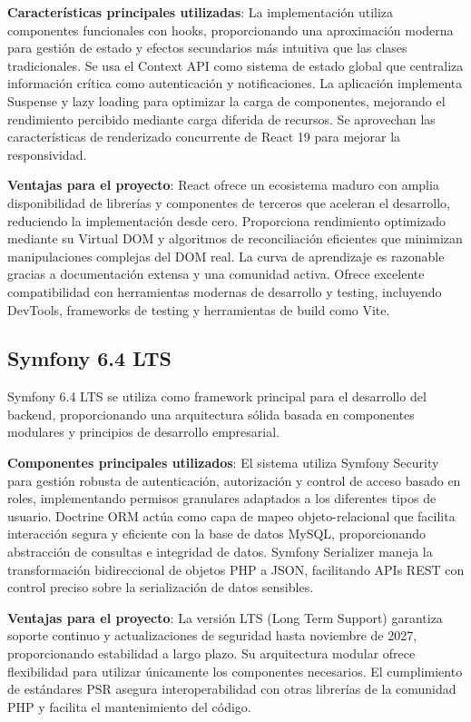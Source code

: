 \documentclass[12pt,a4paper,oneside]{report}
\begin{document}
\textbf{Características principales utilizadas}: La implementación utiliza componentes funcionales con hooks, proporcionando una aproximación moderna para gestión de estado y efectos secundarios más intuitiva que las clases tradicionales. Se usa el Context API como sistema de estado global que centraliza información crítica como autenticación y notificaciones. La aplicación implementa Suspense y lazy loading para optimizar la carga de componentes, mejorando el rendimiento percibido mediante carga diferida de recursos. Se aprovechan las características de renderizado concurrente de React 19 para mejorar la responsividad.

\textbf{Ventajas para el proyecto}: React ofrece un ecosistema maduro con amplia disponibilidad de librerías y componentes de terceros que aceleran el desarrollo, reduciendo la implementación desde cero. Proporciona rendimiento optimizado mediante su Virtual DOM y algoritmos de reconciliación eficientes que minimizan manipulaciones complejas del DOM real. La curva de aprendizaje es razonable gracias a documentación extensa y una comunidad activa. Ofrece excelente compatibilidad con herramientas modernas de desarrollo y testing, incluyendo DevTools, frameworks de testing y herramientas de build como Vite.

\subsection{Symfony 6.4 LTS}\label{symfony-6.4-lts}

Symfony 6.4 LTS se utiliza como framework principal para el desarrollo
del backend, proporcionando una arquitectura sólida basada en
componentes modulares y principios de desarrollo empresarial.

\textbf{Componentes principales utilizados}: El sistema utiliza Symfony Security para gestión robusta de autenticación, autorización y control de acceso basado en roles, implementando permisos granulares adaptados a los diferentes tipos de usuario. Doctrine ORM actúa como capa de mapeo objeto-relacional que facilita interacción segura y eficiente con la base de datos MySQL, proporcionando abstracción de consultas e integridad de datos. Symfony Serializer maneja la transformación bidireccional de objetos PHP a JSON, facilitando APIs REST con control preciso sobre la serialización de datos sensibles.

\textbf{Ventajas para el proyecto}: La versión LTS (Long Term Support) garantiza soporte continuo y actualizaciones de seguridad hasta noviembre de 2027, proporcionando estabilidad a largo plazo. Su arquitectura modular ofrece flexibilidad para utilizar únicamente los componentes necesarios. El cumplimiento de estándares PSR asegura interoperabilidad con otras librerías de la comunidad PHP y facilita el mantenimiento del código.
\end{document}
